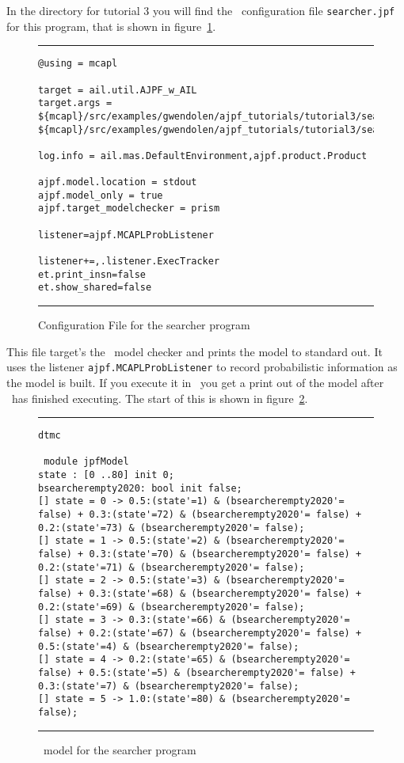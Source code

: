 In the directory for tutorial 3 you will find the \ajpf\ configuration file \texttt{searcher.jpf} for this program, that is shown in figure~\ref{fig:prism_config2}.

\begin{figure}
\noindent\rule{\textwidth}{1pt}
\begin{small}
\begin{verbatim}
@using = mcapl

target = ail.util.AJPF_w_AIL
target.args = ${mcapl}/src/examples/gwendolen/ajpf_tutorials/tutorial3/searcher.ail,
${mcapl}/src/examples/gwendolen/ajpf_tutorials/tutorial3/searcher.psl,1

log.info = ail.mas.DefaultEnvironment,ajpf.product.Product

ajpf.model.location = stdout
ajpf.model_only = true
ajpf.target_modelchecker = prism

listener=ajpf.MCAPLProbListener

listener+=,.listener.ExecTracker
et.print_insn=false
et.show_shared=false
\end{verbatim}
\end{small}
\noindent\rule{\textwidth}{1pt}
\caption{Configuration File for the searcher program}
\label{fig:prism_config2}
\end{figure}

This file target's the \prism\ model checker and prints the model to standard out.  It uses the listener \texttt{ajpf.MCAPLProbListener} to record probabilistic information as the model is built.  If you execute it in \ajpf\ you get a print out of the model after \ajpf\  has finished executing.  The start of this is shown in figure~\ref{fig:prism_output2}.

\begin{figure}
\noindent\rule{\textwidth}{1pt}
\begin{small}
\begin{verbatim}
dtmc

 module jpfModel
state : [0 ..80] init 0;
bsearcherempty2020: bool init false;
[] state = 0 -> 0.5:(state'=1) & (bsearcherempty2020'= false) + 0.3:(state'=72) & (bsearcherempty2020'= false) + 0.2:(state'=73) & (bsearcherempty2020'= false);
[] state = 1 -> 0.5:(state'=2) & (bsearcherempty2020'= false) + 0.3:(state'=70) & (bsearcherempty2020'= false) + 0.2:(state'=71) & (bsearcherempty2020'= false);
[] state = 2 -> 0.5:(state'=3) & (bsearcherempty2020'= false) + 0.3:(state'=68) & (bsearcherempty2020'= false) + 0.2:(state'=69) & (bsearcherempty2020'= false);
[] state = 3 -> 0.3:(state'=66) & (bsearcherempty2020'= false) + 0.2:(state'=67) & (bsearcherempty2020'= false) + 0.5:(state'=4) & (bsearcherempty2020'= false);
[] state = 4 -> 0.2:(state'=65) & (bsearcherempty2020'= false) + 0.5:(state'=5) & (bsearcherempty2020'= false) + 0.3:(state'=7) & (bsearcherempty2020'= false);
[] state = 5 -> 1.0:(state'=80) & (bsearcherempty2020'= false);
\end{verbatim}
\end{small}
\noindent\rule{\textwidth}{1pt}
\caption{\prism\ model for the searcher program}
\label{fig:prism_output2}
\end{figure}

